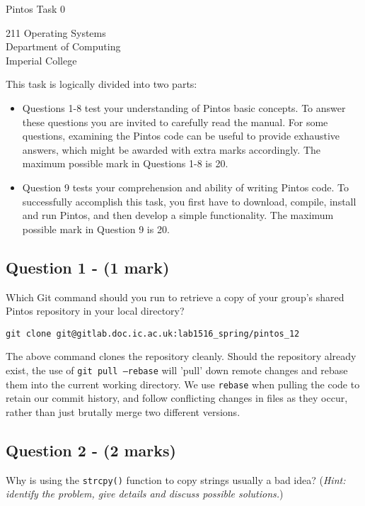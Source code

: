 \documentclass[a4paper,12pt]{article}
\begin{document}
\small

\begin{center}
\begin{LARGE}
Pintos Task 0
\end{LARGE}
\end{center}

\begin{center}
211 Operating Systems \\
Department of Computing \\
Imperial College
\end{center}

This task is logically divided into two parts:
\begin{itemize}
\item Questions 1-8 test your understanding of Pintos basic concepts.
      To answer these questions you are invited to carefully read the manual.
      For some questions, examining the Pintos code can be useful to provide exhaustive answers, which might be awarded with extra marks accordingly.
      The maximum possible mark in Questions 1-8 is 20.

\item Question 9 tests your comprehension and ability of writing Pintos code.
      To successfully accomplish this task, you first have to download, compile, install and run Pintos, and then develop a simple functionality.
      The maximum possible mark in Question 9 is 20.
\end{itemize}

\subsection*{Question 1 - (1 mark)}
Which Git command should you run to retrieve a copy of your group’s shared Pintos repository in your local directory?

\begin{verbatim}
git clone git@gitlab.doc.ic.ac.uk:lab1516_spring/pintos_12
\end{verbatim}

The above command clones the repository cleanly. Should the repository already exist, the use of \texttt{git pull --rebase} will 'pull' down remote changes and rebase them into the current working directory. We use \texttt{rebase} when pulling the code to retain our commit history, and follow conflicting changes in files as they occur, rather than just brutally merge two different versions.

\subsection*{Question 2 - (2 marks)}
Why is using the \texttt{strcpy()} function to copy strings usually a bad idea?
(\textit{Hint: identify the problem, give details and discuss possible solutions.}) \\
\end{document}
